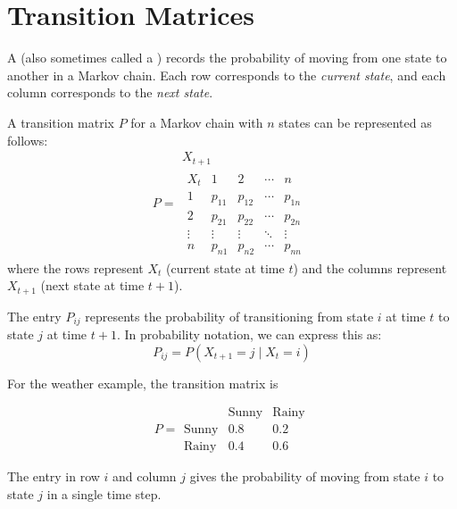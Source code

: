 \section{Transition Matrices}

A  (also sometimes called a ) records the probability of moving from one state to another in a Markov chain. Each row corresponds to the \emph{current state}, and each column corresponds to the \emph{next state}.

A transition matrix $P$ for a Markov chain with $n$ states can be represented as follows:
\[
    P=
    \begin{array}{c}
        X_{t+1} \\[1em]
        \begin{array}{c|cccc}
            X_t    &
            1      & 2      & \cdots & n               \\ \hline
            1      & p_{11} & p_{12} & \cdots & p_{1n} \\
            2      & p_{21} & p_{22} & \cdots & p_{2n} \\
            \vdots & \vdots & \vdots & \ddots & \vdots \\
            n      & p_{n1} & p_{n2} & \cdots & p_{nn}
        \end{array}
    \end{array}
\]
where the rows represent $X_t$ (current state at time $t$) and the columns represent $X_{t+1}$ (next state at time $t+1$).

The entry $P_{ij}$ represents the probability of transitioning from state $i$ at time $t$ to state $j$ at time $t+1$. In probability notation, we can express this as:
\[
    P_{ij}=P(X_{t+1}=j\mid X_t=i)
\]

For the weather example, the transition matrix is

\[
    P=
    \begin{array}{ccc}
                     & \text{Sunny} & \text{Rainy} \\
        \text{Sunny} & 0.8          & 0.2          \\
        \text{Rainy} & 0.4          & 0.6
    \end{array}
\]

The entry in row $i$ and column $j$ gives the probability of moving from state $i$ to state $j$ in a single time step.


